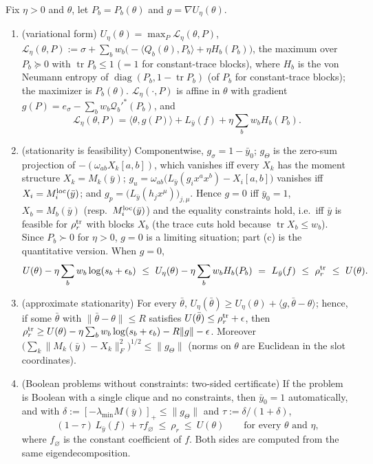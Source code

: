 \documentclass[a4paper,11pt]{article}
\theoremstyle{plain}
\theoremstyle{definition}
\theoremstyle{remark}
\newcommand{\diag}{\operatorname{diag}}
\newcommand{\tr}{\operatorname{tr}}
\newcommand{\lmin}{\lambda_{\min}}
\newcommand{\pos}[1]{[#1]_+}
\newcommand{\iprod}[2]{\langle #1,#2\rangle}
\begin{document}
\begin{proposition}\label{prop:primal}
Fix $\eta>0$ and $\theta$, let $P_b=P_b(\theta)$ and $g=\nabla U_\eta(\theta)$.
\begin{enumerate}[label=(\alph*),leftmargin=2em,nosep]
\item (variational form) $U_\eta(\theta)=\max_P\mathcal L_\eta(\theta,P)$, $\mathcal L_\eta(\theta,P):=\sigma+\sum_bw_b\big(-\iprod{Q_b(\theta)}{P_b}+\eta H_b(P_b)\big)$, the maximum over $P_b\succeq0$ with $\tr P_b\le1$ ($=1$ for constant-trace blocks), where $H_b$ is the von Neumann entropy of $\diag(P_b,1-\tr P_b)$ (of $P_b$ for constant-trace blocks); the maximizer is $P_b(\theta)$. $\mathcal L_\eta(\cdot,P)$ is affine in $\theta$ with gradient $g(P)=e_\sigma-\sum_bw_b\mathcal Q_b'^*(P_b)$, and
\[
\mathcal L_\eta(\theta,P)=\iprod{\theta}{g(P)}+L_{\bar y}(f)+\eta\sum_bw_bH_b(P_b).
\]
\item (stationarity is feasibility) Componentwise, $g_\sigma=1-\bar y_0$; $g_\Theta$ is the zero-sum projection of $-(\omega_{ab}X_k[a,b])$, which vanishes iff every $X_k$ has the moment structure $X_k=M_k(\bar y)$; $g_u=\omega_{ab}\big(L_{\bar y}(g_ix^ax^b)-X_i[a,b]\big)$ vanishes iff $X_i=M_i^{\rm loc}(\bar y)$; and $g_p=\big(L_{\bar y}(h_jx^\mu)\big)_{j,\mu}$. Hence $g=0$ iff $\bar y_0=1$, $X_b=M_b(\bar y)$ (resp.\ $M_i^{\rm loc}(\bar y)$) and the equality constraints hold, i.e.\ iff $\bar y$ is feasible for $\rho_r^{\rm tr}$ with blocks $X_b$ (the trace cuts hold because $\tr X_b\le w_b$). Since $P_b\succ0$ for $\eta>0$, $g=0$ is a limiting situation; part (c) is the quantitative version. When $g=0$,
\[
U(\theta)-\eta\sum_bw_b\log(s_b+\epsilon_b)\ \le\ U_\eta(\theta)-\eta\sum_bw_bH_b(P_b)\ =\ L_{\bar y}(f)\ \le\ \rho_r^{\rm tr}\ \le\ U(\theta).
\]
\item (approximate stationarity) For every $\bar\theta$, $U_\eta(\bar\theta)\ge U_\eta(\theta)+\iprod{g}{\bar\theta-\theta}$; hence, if some $\bar\theta$ with $\|\bar\theta-\theta\|\le R$ satisfies $U(\bar\theta)\le\rho_r^{\rm tr}+\epsilon$, then $\rho_r^{\rm tr}\ge U(\theta)-\eta\sum_bw_b\log(s_b+\epsilon_b)-R\|g\|-\epsilon$. Moreover $\big(\sum_k\|M_k(\bar y)-X_k\|_F^2\big)^{1/2}\le\|g_\Theta\|$ (norms on $\theta$ are Euclidean in the slot coordinates).
\item (Boolean problems without constraints: two-sided certificate) If the problem is Boolean with a single clique and no constraints, then $\bar y_0=1$ automatically, and with $\delta:=\pos{-\lmin M(\bar y)}\le\|g_\Theta\|$ and $\tau:=\delta/(1+\delta)$,
\[
(1-\tau)\,L_{\bar y}(f)+\tau f_\varnothing\ \le\ \rho_r\ \le\ U(\theta)\qquad\text{for every $\theta$ and $\eta$,}
\]
where $f_\varnothing$ is the constant coefficient of $f$. Both sides are computed from the same eigendecomposition.
\end{enumerate}
\end{proposition}
\end{document}
